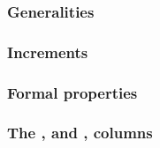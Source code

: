 \subsubsection{Generalities                                                              }    \label{hub: system: hub stamp: generalities}                  %
\subsubsection{Increments                                                                }    \label{hub: system: hub stamp: increments}                    %
\subsubsection{Formal properties                                                         }    \label{hub: system: hub stamp: formal properties}             %
\subsubsection{The \tli, \tliCounter{} and \nonStackRows, \nonStackRowsCounter{} columns }    \label{hub: system: hub stamp: counters}                      %
